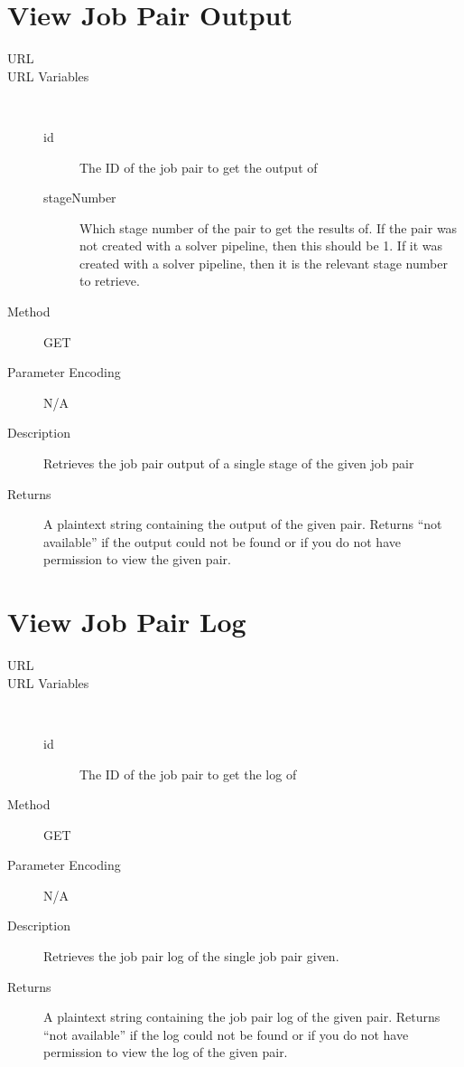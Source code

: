 \section{View Job Pair Output}
\begin{description}
\item [URL] 
\item [URL Variables] \
	\begin{description}
	\item [id]  The ID of the job pair to get the output of
	\item [stageNumber] \type{Integer} Which stage number of the pair to get the results of. If the pair was not created with a solver pipeline, then this should be 1. If it was created with a solver pipeline, then it is the relevant stage number to retrieve.
	\end{description}
\item [Method] GET
\item [Parameter Encoding] N/A
\item [Description] Retrieves the job pair output of a single stage of the given job pair
\item [Returns] A plaintext string containing the output of the given pair. Returns “not available” if the output could not be found or if you do not have permission to view the given pair.
\end{description}


\section{View Job Pair Log}
\begin{description}
\item [URL] 
\item [URL Variables] \
	\begin{description}
	\item [id]  The ID of the job pair to get the log of
	\end{description}
\item [Method] GET
\item [Parameter Encoding] N/A
\item [Description] Retrieves the job pair log of the single job pair given.
\item [Returns] A plaintext string containing the job pair log of the given pair. Returns “not available” if the log could not be found or if you do not have permission to view the log of the given pair.
\end{description}
